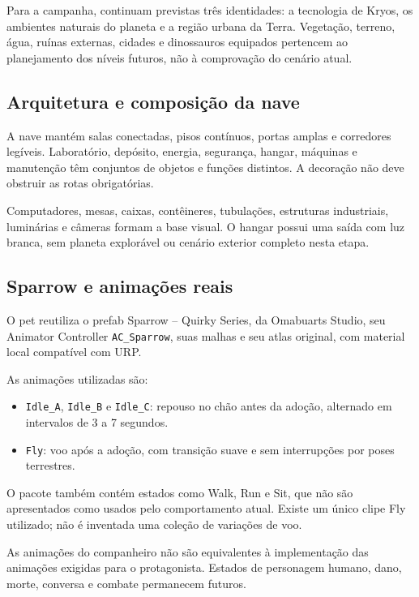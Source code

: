 \documentclass[12pt,a4paper]{article}
\begin{document}
Para a campanha, continuam previstas três identidades:
a tecnologia de Kryos, os ambientes naturais do planeta e a região
urbana da Terra. Vegetação, terreno, água, ruínas externas, cidades
e dinossauros equipados pertencem ao planejamento dos níveis futuros,
não à comprovação do cenário atual.

\subsection*{Arquitetura e composição da nave}

A nave mantém salas conectadas, pisos contínuos, portas amplas e
corredores legíveis. Laboratório, depósito, energia, segurança,
hangar, máquinas e manutenção têm conjuntos de objetos e funções
distintos. A decoração não deve obstruir as rotas obrigatórias.

Computadores, mesas, caixas, contêineres, tubulações, estruturas
industriais, luminárias e câmeras formam a base visual.
O hangar possui uma saída com luz branca, sem planeta explorável
ou cenário exterior completo nesta etapa.

\subsection*{Sparrow e animações reais}

O pet reutiliza o prefab Sparrow -- Quirky Series, da Omabuarts
Studio, seu Animator Controller \texttt{AC\_Sparrow}, suas malhas e
seu atlas original, com material local compatível com URP.

As animações utilizadas são:

\begin{itemize}
\item \texttt{Idle\_A}, \texttt{Idle\_B} e \texttt{Idle\_C}: repouso
no chão antes da adoção, alternado em intervalos de 3 a 7 segundos.
\item \texttt{Fly}: voo após a adoção, com transição suave e sem
interrupções por poses terrestres.
\end{itemize}

O pacote também contém estados como Walk, Run e Sit, que não
são apresentados como usados pelo comportamento atual.
Existe um único clipe Fly utilizado; não é inventada uma coleção
de variações de voo.

As animações do companheiro não são equivalentes à implementação
das animações exigidas para o protagonista. Estados de personagem
humano, dano, morte, conversa e combate permanecem futuros.
\end{document}
